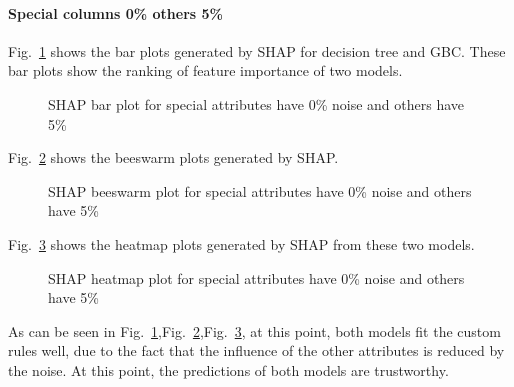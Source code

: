 \documentclass[runningheads,a4paper]{llncs}
\begin{document}
\paragraph{Special columns 0\% others 5\%}
Fig.~\ref{bar plots special_lower 5} shows the bar plots generated by SHAP for decision tree and GBC. These bar plots show the ranking of feature importance of two models.
\begin{figure}[H]
	\centering
	
	\hfill
	
	
	\caption{SHAP bar plot for special attributes have 0\% noise and others have 5\% }
	\label{bar plots special_lower 5}
\end{figure}
Fig.~\ref{bee plots special_lower 5} shows the beeswarm plots generated by SHAP.
\begin{figure}[H]
	\centering
	
	\hfill
	
	
	\caption{SHAP beeswarm plot for special attributes have 0\% noise and others have 5\% }
	\label{bee plots special_lower 5}
	
\end{figure}
Fig.~\ref{heat plots special_lower 5} shows the heatmap plots generated by SHAP from these two models.
\begin{figure}[H]
	\centering
	
	\hfill
	
	
	\caption{SHAP heatmap plot for special attributes have 0\% noise and others have 5\% }
	\label{heat plots special_lower 5}
	
\end{figure}

As can be seen in Fig.~\ref{bar plots special_lower 5},Fig.~\ref{bee plots special_lower 5},Fig.~\ref{heat plots special_lower 5}, at this point, both models fit the custom rules well, due to the fact that the influence of the other attributes is reduced by the noise. At this point, the predictions of both models are trustworthy.
\end{document}
